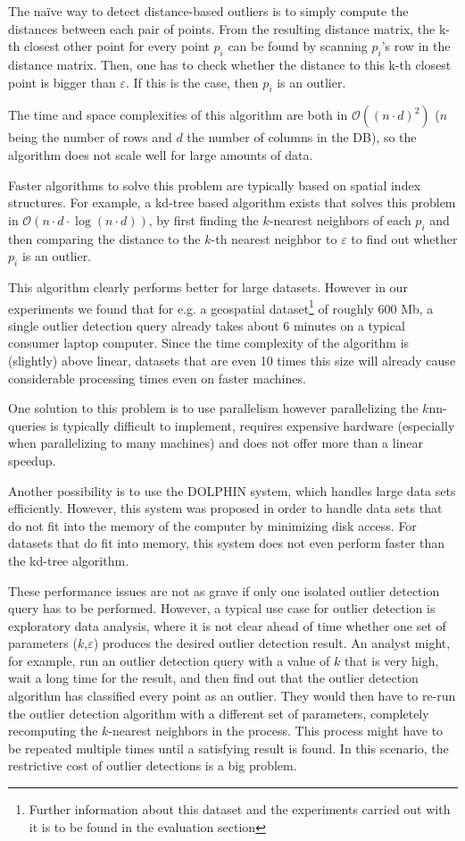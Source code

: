 \documentclass[runningheads]{llncs}
\begin{document}
The na{\"i}ve way to detect distance-based outliers is to simply compute the distances between each pair of points. From the resulting distance matrix, the k-th closest other point for every point $p_i$ can be found by scanning $p_i$'s row in the distance matrix. Then, one has to check whether the distance to this k-th closest point is bigger than $\varepsilon$. If this is the case, then $p_i$ is an outlier.

The time and space complexities of this algorithm are both in $\mathcal{O}((n\cdot d)^2)$ ($n$ being the number of rows and $d$ the number of columns in the DB), so the algorithm does not scale well for large amounts of data.

Faster algorithms to solve this problem are typically based on spatial index structures. For example, a kd-tree based algorithm exists that solves this problem in $\mathcal{O}(n\cdot d \cdot\log(n\cdot d))$, by first finding the $k$-nearest neighbors of each $p_i$ and then comparing the distance to the $k$-th nearest neighbor to $\varepsilon$ to find out whether $p_i$ is an outlier. 

This algorithm clearly performs better for large datasets. However in our experiments we found that for e.g. a geospatial dataset\footnote{Further information about this dataset and the experiments carried out with it is to be found in the evaluation section} of roughly 600 Mb, a single outlier detection query already takes about 6 minutes on a typical consumer laptop computer. Since the time complexity of the algorithm is (slightly) above linear, datasets that are even 10 times this size will already cause considerable processing times even on faster machines.

One solution to this problem is to use parallelism \cite{parallel_knn}
however parallelizing the $k$nn-queries is typically difficult to implement, requires expensive hardware (especially when parallelizing to many machines) and does not offer more than a linear speedup.

Another possibility is to use the DOLPHIN system\cite{dolphin}, which handles large data sets efficiently. However, this system was proposed in order to handle data sets that do not fit into the memory of the computer by minimizing disk access. For datasets that do fit into memory, this system does not even perform faster than the kd-tree algorithm.

These performance issues are not as grave if only one isolated outlier detection query has to be performed. However, a typical use case for outlier detection is exploratory data analysis, where it is not clear ahead of time whether one set of parameters ($k$,$\varepsilon$) produces the desired outlier detection result. An analyst might, for example, run an outlier detection query with a value of $k$ that is very high, wait a long time for the result, and then find out that the outlier detection algorithm has classified every point as an outlier. They would then have to re-run the outlier detection algorithm with a different set of parameters, completely recomputing the $k$-nearest neighbors in the process. This process might have to be repeated multiple times until a satisfying result is found. In this scenario, the restrictive cost of outlier detections is a big problem.
\end{document}
